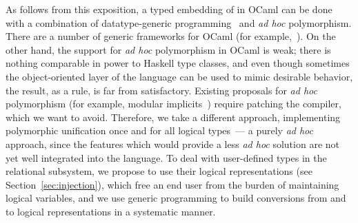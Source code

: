 As follows from this exposition, a typed embedding of \miniKanren in OCaml can be done with
a combination of datatype-generic programming~\cite{DGP} and \emph{ad hoc} polymorphism. There are 
a number of generic frameworks for OCaml (for example,~\cite{Deriving}). On the other hand, the support
for \emph{ad hoc} polymorphism in OCaml is weak; there is nothing comparable in power to Haskell
type classes, and even though sometimes the object-oriented layer of the language can be used to mimic
desirable behavior, the result, as a rule, is far from satisfactory. Existing proposals for \emph{ad hoc} polymorphism (for example,
modular implicits~\cite{Implicits}) require patching the compiler, which we want to avoid. Therefore, we 
take a different approach, implementing polymorphic unification once and for all logical types~--- a purely \emph{ad hoc} 
approach, since the features which would provide a less \emph{ad hoc} solution are not yet well integrated into the language. To deal
with user-defined types in the relational subsystem, we propose to use their logical representations (see Section~\ref{sec:injection}), 
which free an end user from the burden of maintaining logical variables, and we use generic programming to build conversions from and to logical
representations in a systematic manner.



